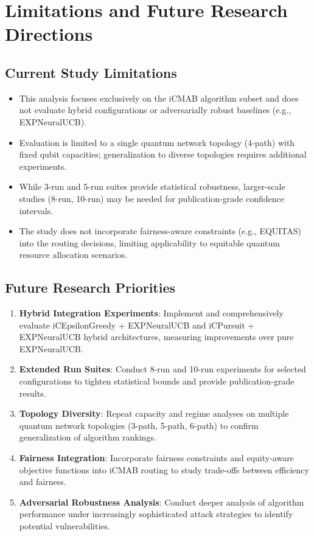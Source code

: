 \documentclass[12pt,a4paper]{article}
\begin{document}
\section{Limitations and Future Research Directions}

\subsection{Current Study Limitations}

\begin{itemize}
\item This analysis focuses exclusively on the iCMAB algorithm subset and does not evaluate hybrid configurations or adversarially robust baselines (e.g., EXPNeuralUCB).
\item Evaluation is limited to a single quantum network topology (4-path) with fixed qubit capacities; generalization to diverse topologies requires additional experiments.
\item While 3-run and 5-run suites provide statistical robustness, larger-scale studies (8-run, 10-run) may be needed for publication-grade confidence intervals.
\item The study does not incorporate fairness-aware constraints (e.g., EQUITAS) into the routing decisions, limiting applicability to equitable quantum resource allocation scenarios.
\end{itemize}

\subsection{Future Research Priorities}

\begin{enumerate}
\item \textbf{Hybrid Integration Experiments}: Implement and comprehensively evaluate iCEpsilonGreedy + EXPNeuralUCB and iCPursuit + EXPNeuralUCB hybrid architectures, measuring improvements over pure EXPNeuralUCB.
\item \textbf{Extended Run Suites}: Conduct 8-run and 10-run experiments for selected configurations to tighten statistical bounds and provide publication-grade results.
\item \textbf{Topology Diversity}: Repeat capacity and regime analyses on multiple quantum network topologies (3-path, 5-path, 6-path) to confirm generalization of algorithm rankings.
\item \textbf{Fairness Integration}: Incorporate fairness constraints and equity-aware objective functions into iCMAB routing to study trade-offs between efficiency and fairness.
\item \textbf{Adversarial Robustness Analysis}: Conduct deeper analysis of algorithm performance under increasingly sophisticated attack strategies to identify potential vulnerabilities.
\end{enumerate}
\end{document}
